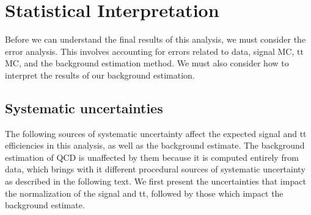 \chapter{Statistical Interpretation}\label{Sec:Stat}

Before we can understand the final results of this analysis, we must consider the error analysis. This involves accounting for errors related to data, signal MC, tt MC, and the background estimation method. We must also consider how to interpret the results of our background estimation. 

\section{Systematic uncertainties\label{sec:Systematics}}

The following sources of systematic uncertainty affect the expected signal and tt efficiencies in this analysis, as well as the background estimate. The background estimation of QCD is unaffected by them because it is computed entirely from data, which brings with it different procedural sources of systematic uncertainty as described in the following text. We first present the uncertainties that impact the normalization of the signal and tt, followed by those which impact the background estimate.


